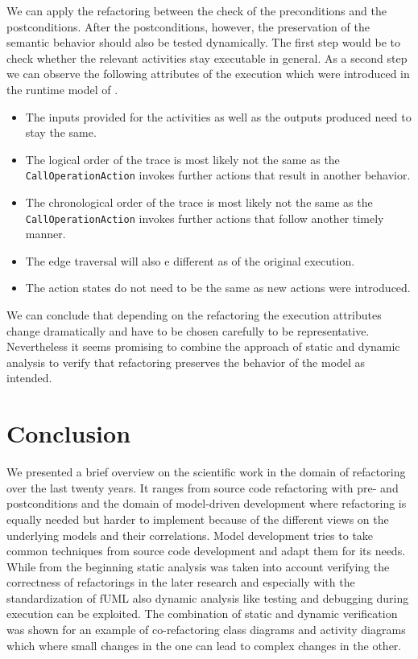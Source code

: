 \documentclass{llncs}
\begin{document}
We can apply the refactoring between the check of the preconditions and the postconditions. After the postconditions, however, the preservation 
of the semantic behavior should also be tested dynamically. The first step would be to check whether the relevant activities stay executable 
in general. As a second step we can observe the following attributes of the execution which were introduced in the runtime model of 
\cite{DBLP:conf/models/MayerhoferLK12}.

\begin{itemize}
 \item The inputs provided for the activities as well as the outputs produced need to stay the same.
 \item The logical order of the trace is most likely not the same as the \texttt{Call\-Operation\-Action} invokes further actions that result 
 in another behavior.
 \item The chronological order of the trace is most likely not the same as the \texttt{Call\-Operation\-Action} invokes further actions 
 that follow another timely manner.
 \item The edge traversal will also e different as of the original execution.
 \item The action states do not need to be the same as new actions were introduced.
\end{itemize}

We can conclude that depending on the refactoring the execution attributes change dramatically and have to be chosen carefully to 
be representative. Nevertheless it seems promising to combine the approach of static and dynamic analysis to verify that  refactoring 
preserves the behavior of the model as intended.

\section{Conclusion}
\label{sec:conclusion}

We presented a brief overview on the scientific work in the domain of refactoring over the last twenty years. It ranges
from source code refactoring with pre- and postconditions and the domain of model-driven development
where refactoring is equally needed but harder to implement because of the different views on the underlying models and
their correlations. Model development tries to take common techniques from source code development and adapt them for
its needs. While from the beginning static analysis was taken into account verifying the correctness of refactorings in the later research and especially with the
standardization of fUML also dynamic analysis like testing and debugging during execution can be exploited. The combination 
of static and dynamic verification was shown for an example of co-refactoring class diagrams and activity diagrams which where 
small changes in the one can lead to complex changes in the other.

\newpage


\end{document}
